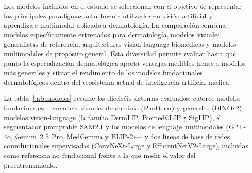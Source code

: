 Los modelos incluidos en el estudio se seleccionan con el objetivo
de representar los principales paradigmas actualmente utilizados en
visión artificial y aprendizaje multimodal aplicado a dermatología.
La comparación combina modelos específicamente entrenados para
dermatología, modelos visuales generalistas de referencia,
arquitecturas vision-language biomédicas y modelos multimodales de
propósito general. Esta diversidad permite evaluar hasta qué punto
la especialización dermatológica aporta ventajas medibles frente a
modelos más generales y situar el rendimiento de los modelos
fundacionales dermatológicos dentro del ecosistema actual de
inteligencia artificial médica.

La tabla~\ref{tab:modelos} resume los dieciséis sistemas evaluados:
catorce modelos fundacionales ---encoders visuales de dominio
(PanDerm) y generales (DINOv2), modelos vision-language (la familia
DermLIP, BiomedCLIP y SigLIP), el segmentador promptable SAM2.1 y
los modelos de lenguaje multimodales (GPT-4o, Gemini~2.5~Pro,
MedGemma y BLIP-2)--- y dos líneas de base de redes convolucionales
supervisadas (ConvNeXt-Large y EfficientNetV2-Large), incluidas como
referencia no fundacional frente a la que medir el valor del
preentrenamiento.

